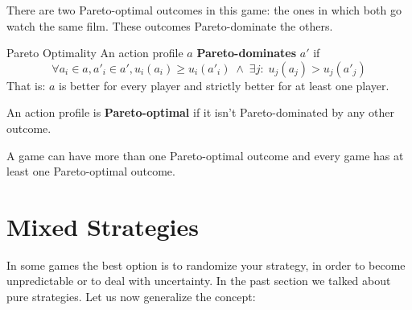 \documentclass{tufte-handout}
\begin{document}
\begin{marginfigure}

\begin{center}
\end{center}
\vspace*{2mm}

There are two Pareto-optimal outcomes in this game: the ones in which
both go watch the same film. These outcomes Pareto-dominate the others.

\end{marginfigure}

\begin{definition}{Pareto Optimality}
  An action profile $a$ \textbf{Pareto-dominates} $a'$ if
  \[ \forall a_i \in a, a'_i \in a', u_i(a_i) \geq u_i(a'_i)
  \; \wedge \; \exists j: \; u_j(a_j) > u_j(a'_j)\]
  That is: $a$ is better for every player and strictly
  better for at least one player.

  An action profile is \textbf{Pareto-optimal} if it isn't
  Pareto-dominated by any other outcome.
\end{definition}

A game can have more than one Pareto-optimal outcome and every game
has at least one Pareto-optimal outcome.

\section{Mixed Strategies}

In some games the best option is to randomize your strategy, in order to
become unpredictable or to deal with uncertainty. In the past section we
talked about pure strategies. Let us now generalize the concept:
\end{document}
